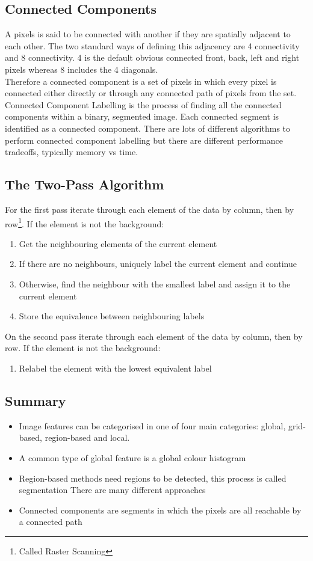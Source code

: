\documentclass{article}
\begin{document}
	\subsection{Connected Components}
	A pixels is said to be connected with another if they are spatially adjacent to each other. The two standard ways of defining this adjacency are 4 connectivity and 8 connectivity. 4 is the default obvious connected front, back, left and right pixels whereas 8 includes the 4 diagonals.\\
	Therefore a connected component is a set of pixels in which every pixel is connected either directly or through any connected path of pixels from the set.\\
	Connected Component Labelling is the process of finding all the connected components within a binary, segmented image. Each connected segment is identified as a connected component. There are lots of different algorithms to perform connected component labelling but there are different performance tradeoffs, typically memory vs time.
	\subsection{The Two-Pass Algorithm}
	For the first pass iterate through each element of the data by column, then by row\footnote{Called Raster Scanning}. If the element is not the background:
	\begin{enumerate}
		\item Get the neighbouring elements of the current element
		\item If there are no neighbours, uniquely label the current element and continue
		\item Otherwise, find the neighbour with the smallest label and assign it to the current element
		\item Store the equivalence between neighbouring labels
	\end{enumerate}
	On the second pass iterate through each element of the data by column, then by row. If the element is not the background:
	\begin{enumerate}
		\item Relabel the element with the lowest equivalent label
	\end{enumerate}
	\subsection{Summary}
	\begin{itemize}
		\item Image features can be categorised in one of four main categories: global, grid-based, region-based and local.
		\item A common type of global feature is a global colour histogram
		\item Region-based methods need regions to be detected, this process is called segmentation
		\subitem There are many different approaches
		\item Connected components are segments in which the pixels are all reachable by a connected path
	\end{itemize}
\end{document}
